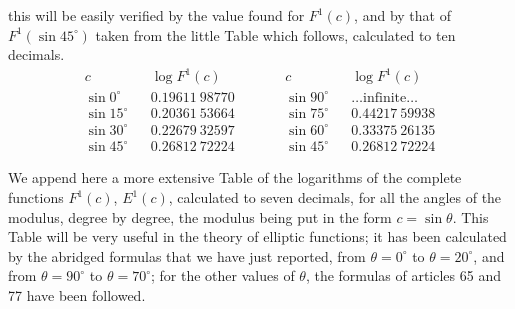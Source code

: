 \documentclass{article}
\begin{document}
this will be easily verified by the value found for $F^{1}(c)$, and by that of $F^{1}(\sin 45^{\circ})$ taken from the little Table which follows, calculated to ten decimals.
\[ \begin{aligned} c && \log F^{1}(c) &\qquad& c && \log F^{1}(c)\\ \sin 0^{\circ} && 0.19611\ 98770 && \sin 90^{\circ} && \ldots\text{infinite}\ldots\\ \sin 15^{\circ} && 0.20361\ 53664 && \sin 75^{\circ} && 0.44217\ 59938\\ \sin 30^{\circ} && 0.22679\ 32597 && \sin 60^{\circ} && 0.33375\ 26135\\ \sin 45^{\circ} && 0.26812\ 72224 && \sin 45^{\circ} && 0.26812\ 72224 \end{aligned} \]

We append here a more extensive Table of the logarithms of the complete functions $F^{1}(c)$, $E^{1}(c)$, calculated to seven decimals, for all the angles of the modulus, degree by degree, the modulus being put in the form $c=\sin\theta$. This Table will be very useful in the theory of elliptic functions; it has been calculated by the abridged formulas that we have just reported, from $\theta=0^{\circ}$ to $\theta=20^{\circ}$, and from $\theta=90^{\circ}$ to $\theta=70^{\circ}$; for the other values of $\theta$, the formulas of articles 65 and 77 have been followed.
\end{document}
